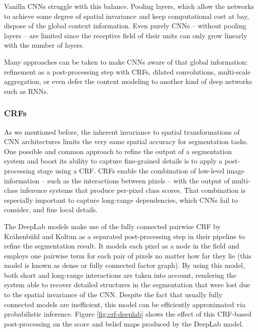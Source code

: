 Vanilla \acp{CNN} struggle with this balance. Pooling layers, which allow the networks to achieve some degree of spatial invariance and keep computational cost at bay, dispose of the global context information. Even purely \acp{CNN} -- without pooling layers -- are limited since the receptive field of their units can only grow linearly with the number of layers.

Many approaches can be taken to make \acp{CNN} aware of that global information: refinement as a post-processing step with \acp{CRF}, dilated convolutions, multi-scale aggregation, or even defer the context modeling to another kind of deep networks such as \acp{RNN}.

\subsubsection{\aclp{CRF}}

As we mentioned before, the inherent invariance to spatial transformations of \ac{CNN} architectures limits the very same spatial accuracy for segmentation tasks. One possible and common approach to refine the output of a segmentation system and boost its ability to capture fine-grained details is to apply a post-processing stage using a \acf{CRF}. \acp{CRF} enable the combination of low-level image information -- such as the interactions between pixels \cite{Rother2004}\cite{Shotton2009} -- with the output of multi-class inference systems that produce per-pixel class scores. That combination is especially important to capture long-range dependencies, which \acp{CNN} fail to consider, and fine local details.

The DeepLab models \cite{Chen2014a}\cite{Chen2016} make use of the fully connected pairwise \ac{CRF} by Krähenbühl and Koltun\cite{Koltun2011}\cite{Kraehenbuehl2013} as a separated post-processing step in their pipeline to refine the segmentation result. It models each pixel as a node in the field and employs one pairwise term for each pair of pixels no matter how far they lie (this model is known as dense or fully connected factor graph). By using this model, both short and long-range interactions are taken into account, rendering the system able to recover detailed structures in the segmentation that were lost due to the spatial invariance of the \ac{CNN}. Despite the fact that usually fully connected models are inefficient, this model can be efficiently approximated via probabilistic inference. Figure \ref{fig:crf-deeplab} shows the effect of this \ac{CRF}-based post-processing on the score and belief maps produced by the DeepLab model.

